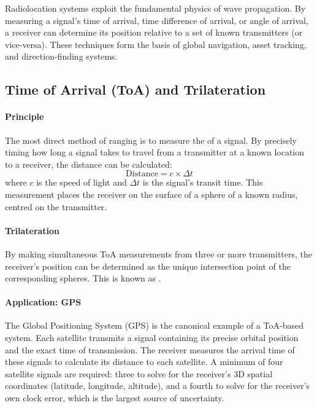 \begin{keyconcept}
    Radiolocation systems exploit the fundamental physics of wave propagation. By measuring a signal's time of arrival, time difference of arrival, or angle of arrival, a receiver can determine its position relative to a set of known transmitters (or vice-versa). These techniques form the basis of global navigation, asset tracking, and direction-finding systems.
\end{keyconcept}

\subsection{Time of Arrival (ToA) and Trilateration}

\paragraph{Principle}
The most direct method of ranging is to measure the  of a signal. By precisely timing how long a signal takes to travel from a transmitter at a known location to a receiver, the distance can be calculated:
\begin{equation}
    \text{Distance} = c \times \Delta t
\end{equation}
where \(c\) is the speed of light and \(\Delta t\) is the signal's transit time. This measurement places the receiver on the surface of a sphere of a known radius, centred on the transmitter.

\paragraph{Trilateration}
By making simultaneous ToA measurements from three or more transmitters, the receiver's position can be determined as the unique intersection point of the corresponding spheres. This is known as .

\paragraph{Application: GPS}
The Global Positioning System (GPS) is the canonical example of a ToA-based system. Each satellite transmits a signal containing its precise orbital position and the exact time of transmission. The receiver measures the arrival time of these signals to calculate its distance to each satellite. A minimum of four satellite signals are required: three to solve for the receiver's 3D spatial coordinates (latitude, longitude, altitude), and a fourth to solve for the receiver's own clock error, which is the largest source of uncertainty.

